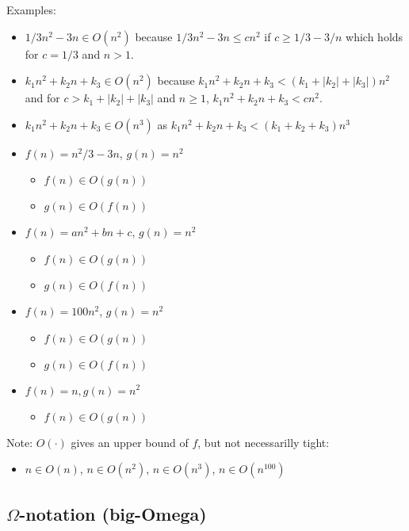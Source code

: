\documentclass[11pt]{article}
\begin{document}
Examples: 
\begin{itemize}
\item $1/3n^2-3n\in O(n^2)$ because $1/3n^2-3n\leq cn^2$ if $c\geq
  1/3-3/n$ which holds for $c=1/3$ and $n>1$.
  
\item $k_1n^2+k_2n+k_3\in O(n^2)$ because
  $k_1n^2+k_2n+k_3<(k_1+|k_2|+|k_3|)n^2$ and for $c>k_1+|k_2|+|k_3|$
  and $n\geq1$, $k_1n^2+k_2n+k_3<cn^2$.
  
\item $k_1n^2+k_2n+k_3\in O(n^3)$ as
$k_1n^2+k_2n+k_3<(k_1+k_2+k_3)n^3$ 

\item $f(n) = n^2/3 -3n$, $g(n) = n^2$ 
    \begin{itemize}
    \item $f(n) \in O(g(n))$
    \item  $g(n) \in O(f(n))$
    \end{itemize}
\item $f(n) = an^2 + bn +c$, $g(n) = n^2$
    \begin{itemize}
    \item $f(n) \in O(g(n))$
    \item  $g(n) \in O(f(n))$
    \end{itemize}
\item $f(n) = 100n^2$, $g(n) = n^2$
    \begin{itemize}
    \item $f(n) \in O(g(n))$
    \item  $g(n) \in O(f(n))$
    \end{itemize}
\item $f(n) = n, g(n) = n^2$
    \begin{itemize}
    \item $f(n) \in O(g(n))$
        \end{itemize}
\end{itemize}




Note: $O(\cdot)$ gives an upper bound of $f$, but not necessarilly
tight:
\begin{itemize}
\item  $n \in O(n)$,   $n \in O(n^2)$,  $n\in O(n^3)$,  $n \in O(n^{100})$
\end{itemize}





\subsection{$\Omega$-notation (big-Omega)}
\end{document}
